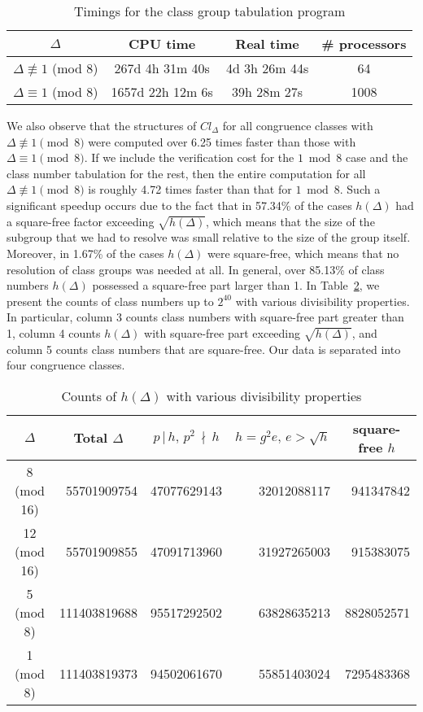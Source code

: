 \documentclass{mcom-l}
\theoremstyle{definition}
\begin{document}
\begin{table}[!ht]
\centering
\caption{Timings for the class group tabulation program}
\label{tab:timings_class_group}
\begin{tabular}{| c || c | c | c |}
\hline
$\Delta$ & CPU time & Real time & \# processors\\
\hline
$\Delta \not \equiv 1$ (mod 8) & 267d 4h 31m 40s & 4d 3h 26m 44s & 64\\
\hline
$\Delta \equiv 1$ (mod 8) & 1657d 22h 12m 6s & 39h 28m 27s & 1008\\
\hline
\end{tabular}
\end{table}

We also observe that the structures of $Cl_\Delta$ for all congruence
classes with $\Delta \not \equiv 1 \pmod{8}$ were computed over 6.25
times faster than those with $\Delta \equiv 1 \pmod{8}.$ If we include
the verification cost for the $1 \bmod 8$ case and the class number
tabulation for the rest, then the entire computation for all $\Delta
\not \equiv 1 \pmod{8}$ is roughly 4.72 times faster than that for $1
\bmod 8.$ Such a significant speedup occurs due to the fact that in
57.34\% of the cases $h(\Delta)$ had a square-free factor exceeding
$\sqrt{h(\Delta)}$, which means that the size of the subgroup that we
had to resolve was small relative to the size of the group
itself. Moreover, in 1.67\% of the cases $h(\Delta)$ were square-free,
which means that no resolution of class groups was needed at all.  In
general, over 85.13\% of class numbers $h(\Delta)$ possessed a
square-free part larger than 1. In Table~\ref{tab:count_h}, we present
the counts of class numbers up to $2^{40}$ with various divisibility
properties. In particular, column 3 counts class numbers with
square-free part greater than 1, column 4 counts $h(\Delta)$ with
square-free part exceeding $\sqrt{h(\Delta)}$, and column 5 counts
class numbers that are square-free. Our data is separated into four
congruence classes.
\begin{table}[h]
\centering
\caption{Counts of $h(\Delta)$ with various divisibility properties}
\begin{tabular}{| c || r | r | r | r |}
\hline
$\Delta$ & \multicolumn{1}{c|}{Total $\Delta$} & \multicolumn{1}{c|}{$p\,|\,h,\,p^2\,\nmid\,h$} & \multicolumn{1}{c|}{$h=g^2e,\,e > \sqrt{h}$} & \multicolumn{1}{c|}{square-free $h$}\\
\hline
\hline
8 (mod 16) & 55701909754 & 47077629143 & 32012088117 & 941347842\\
\hline
12 (mod 16) & 55701909855 & 47091713960 & 31927265003 & 915383075\\ 
\hline
5 (mod 8) & 111403819688 & 95517292502 & 63828635213 & 8828052571\\
\hline
1 (mod 8) & 111403819373 & 94502061670 & 55851403024 & 7295483368\\
\hline
\end{tabular} \label{tab:count_h}
\end{table}
\end{document}
